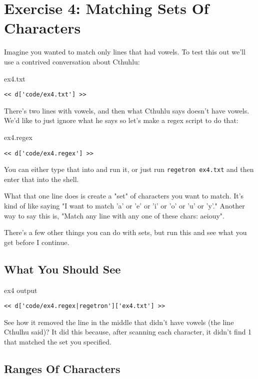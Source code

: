 \chapter{Exercise 4: Matching Sets Of Characters}

Imagine you wanted to match only lines that had vowels.  To test this out
we'll use a contrived conversation about Cthuhlu:

\begin{code}{ex4.txt}
\begin{Verbatim}
<< d['code/ex4.txt'] >>
\end{Verbatim}
\end{code}

There's two lines with vowels, and then what Cthuhlu says doesn't have vowels.
We'd like to just ignore what he says so let's make a regex script to do that:

\begin{code}{ex4.regex}
\begin{Verbatim}
<< d['code/ex4.regex'] >>
\end{Verbatim}
\end{code}

You can either type that into  and run it, or just run
\verb|regetron ex4.txt| and then enter that into the shell.

What that one line does is create a "set" of characters you want to match.
It's kind of like saying "I want to match 'a' or 'e' or 'i' or 'o' or 'u' or 'y'."
Another way to say this is, "Match any line with any one of these chars: aeiouy".

There's a few other things you can do with sets, but run this and see what you
get before I continue.

\section{What You Should See}

\begin{code}{ex4 output}
\begin{Verbatim}
<< d['code/ex4.regex|regetron']['ex4.txt'] >>
\end{Verbatim}
\end{code}

See how it removed the line in the middle that didn't have vowels (the
line Cthulhu said)?  It did this because, after scanning each character,
it didn't find 1 that matched the set you specified.

\section{Ranges Of Characters}

